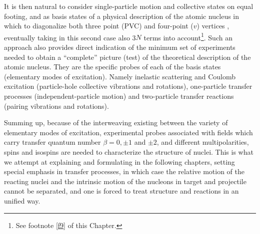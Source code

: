 It is then natural to consider single-particle motion  and collective states on equal footing, and as basis states of a physical description of the atomic nucleus in which to diagonalize both three point  (PVC) and four-point ($v$) vertices , eventually taking in this second case also 3$N$ terms into account\footnote{See footnote \ref{f9} of this Chapter.}. Such an approach also provides direct indication of the minimum set of experiments needed to obtain a ``complete'' picture (test)  of the theoretical description of the atomic nucleus. They are the specific probes of each of the basis states (elementary modes of excitation). Namely inelastic scattering and Coulomb excitation (particle-hole collective vibrations and rotations), one-particle transfer processes (independent-particle motion) and two-particle transfer reactions (pairing vibrations and rotations). 


Summing up, because of the interweaving existing between the variety of elementary modes of excitation, experimental probes associated with fields which carry transfer quantum number $\beta=0, \pm 1$ and $\pm2$, and different multipolarities, spins and isospins are needed to characterize the structure of nuclei. This is what we attempt at explaining and formulating in the following chapters, setting special emphasis in transfer processes, in which case the relative motion of the reacting nuclei and the intrinsic motion of the nucleons in target and projectile cannot be separated, and one is forced to treat structure and reactions in an unified way.









%

%
